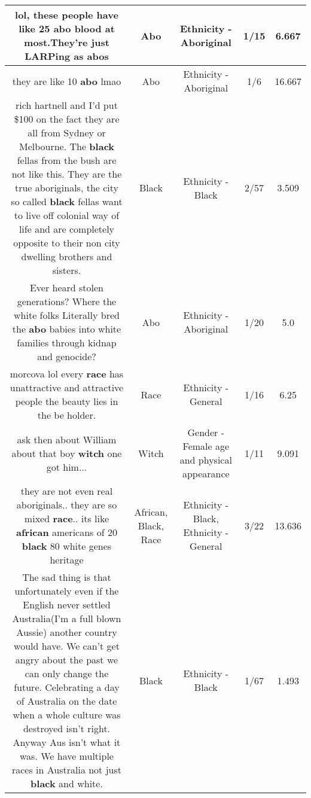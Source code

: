\documentclass[11pt]{article}
\newlength\mylength
\begin{document}
\begin{center}
\begin{longtable}{|C{.65\mylength}|C{.30\mylength}|C{.12\mylength}|C{.12\mylength}|C{.12\mylength}|}
  \small lol, these people have like 25 \textbf{abo} blood at most.They're just LARPing as abos\normalsize   & Abo & Ethnicity - Aboriginal & 1/15 & 6.667 \\  \hline
  \small they are like 10 \textbf{abo} lmao\normalsize   & Abo & Ethnicity - Aboriginal & 1/6 & 16.667 \\  \hline
  \small rich hartnell and I'd put \$100 on the fact they are all from Sydney or Melbourne. The \textbf{black} fellas from the bush are not like this. They are the true aboriginals, the city so called \textbf{black} fellas want to live off colonial way of life and are completely opposite to their non city dwelling brothers and sisters.\normalsize   & Black & Ethnicity - Black & 2/57 & 3.509 \\  \hline
  \small Ever heard stolen generations? Where the white folks Literally bred the \textbf{abo} babies into white families through kidnap and genocide?\normalsize   & Abo & Ethnicity - Aboriginal & 1/20 & 5.0 \\  \hline
  \small morcova lol every \textbf{race} has unattractive and attractive people the beauty lies in the be holder.\normalsize   & Race & Ethnicity - General & 1/16 & 6.25 \\  \hline
  \small ask then about  William about that boy  \textbf{witch} one got him...\normalsize   & Witch & Gender - Female age and physical appearance & 1/11 & 9.091 \\  \hline
  \small they are not even real aboriginals.. they are so mixed \textbf{race}.. its like \textbf{african} americans of 20 \textbf{black} 80 white genes heritage\normalsize   & African, Black, Race & Ethnicity - Black, Ethnicity - General & 3/22 & 13.636 \\  \hline
  \small The sad thing is that unfortunately even if the English never settled Australia(I'm a full blown Aussie) another country would have. We can't get angry about the past we can only change the future. Celebrating a day of Australia on the date when a whole culture was destroyed isn't right. Anyway Aus isn't what it was. We have multiple races in Australia not just \textbf{black} and white.\normalsize   & Black & Ethnicity - Black & 1/67 & 1.493 \\  \hline

\end{longtable}
\end{center}
\end{document}
